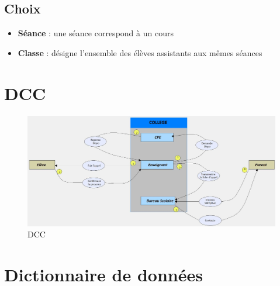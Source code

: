 \documentclass[12pt,french,titlepage]{article}
\begin{document}
	  \subsection{Choix}
	  
	  \begin{itemize}
	      \item \textbf{Séance} : une séance correspond à un cours
	      \item \textbf{Classe} : désigne l'ensemble des élèves assistants aux mêmes séances 
	  \end{itemize}
	  
	  \section{DCC}
	  
	  \begin{figure}[H]
	      \centering
	      \includegraphics{./DCC.jpg}
	      \caption{DCC}
	      \label{fig:my_label}
	  \end{figure}
	  
	  \section{Dictionnaire de données}
	  
\end{document}
